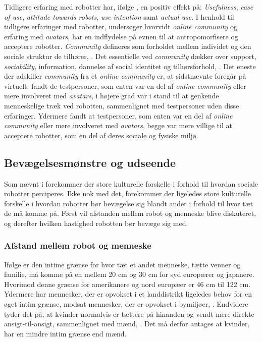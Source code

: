Tidligere erfaring med robotter har, ifølge \textcite[s. 1479]{PDF:ExploringInfluencingVariable}, en positiv effekt på: \textit{Usefulness}, \textit{ease of use}, \textit{attitude towards robots}, \textit{use intention} samt \textit{actual use}. I henhold til tidligere erfaringer med robotter, undersøger \textcite{PDF:CloseButNotStuck} hvorvidt \textit{online community} og erfaring med \textit{avatars}, har en indflydelse på evnen til at antropomorfisere og acceptere robotter. \textit{Community} defineres som forholdet mellem individet og den sociale struktur de tilhører, \parencite[ss. 20-21]{PDF:CloseButNotStuck}. Det essentielle ved \textit{community} dækker over support, \textit{sociability}, information, dannelse af social identitet og tilhørsforhold, \parencite[s. 21]{PDF:CloseButNotStuck}. Det eneste der adskiller \textit{community} fra et \textit{online community} er, at sidstnævnte foregår på virtuelt. \textcite[s. 25]{PDF:CloseButNotStuck} fandt de testpersoner, som enten var en del af \textit{online community} eller mere involveret med \textit{avatars}, i højere grad var i stand til at genkende menneskelige træk ved robotten, sammenlignet med testpersoner uden disse erfaringer. Ydermere fandt \textcite[s. 26]{PDF:CloseButNotStuck} at testpersoner, som enten var en del af \textit{online community} eller mere involveret med \textit{avatars}, begge var mere villige til at acceptere robotter, som en del af deres sociale og fysiske miljø.  
%

\subsection{Bevægelsesmønstre og udseende}
\label{InteraktionSocialeRobotterParametreBevaegelsesmoenstre}
%
Som nævnt i  forekommer der store kulturelle forskelle i forhold til hvordan sociale robotter perciperes. Ikke nok med det, forekommer der ligeledes store kulturelle forskelle i hvordan robotter bør bevægelse sig blandt andet i forhold til hvor tæt de må komme på. Først vil afstanden mellem robot og menneske blive diskuteret, og derefter hvilken hastighed robotten bør bevæge sig med. 

\subsubsection*{Afstand mellem robot og menneske}
\label{InteraktionSocialeRobotterParametreBevaegelsesmoenstreAfstand}
%
Ifølge \textcite[s. 178]{PDF:HowMayIServeYou} er den intime grænse for hvor tæt et andet menneske, tætte venner og familie, må komme på en mellem 20 cm og 30 cm for syd europærer og japanere. Hvorimod denne grænse for amerikanere og nord europæer er 46 cm til 122 cm. Ydermere har mennesker, der er opvokset i et landdistrikt ligeledes behov for en øget intim grænse, modsat mennesker, der er opvokset i bymiljøer, \textcite[s. 178]{PDF:HowMayIServeYou}. Endvidere tyder det på, at kvinder normalvis er tættere på hinanden og vendt mere direkte ansigt-til-ansigt, sammenlignet med mænd, \parencite[s. 178]{PDF:HowMayIServeYou}. Det må derfor antages at kvinder, har en mindre intim grænse end mænd.

